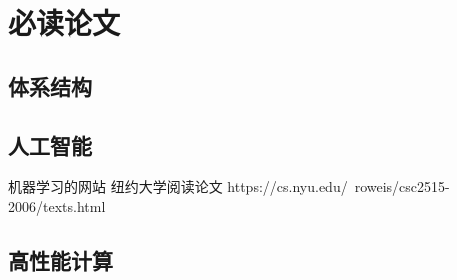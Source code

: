 \chapter{必读论文}

\section{体系结构}


\section{人工智能}

机器学习的网站 纽约大学阅读论文
https://cs.nyu.edu/~roweis/csc2515-2006/texts.html



\section{高性能计算}


\section{}